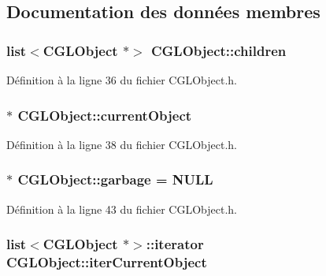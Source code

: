 \subsection{Documentation des données membres}
\hypertarget{class_c_g_l_object_ac7dc91801d4a50f24e1624283a7a3190}{
\subsubsection[{children}]{\setlength{\rightskip}{0pt plus 5cm}list$<${\bf C\-G\-L\-Object} $\ast$$>$ C\-G\-L\-Object\-::children\hspace{0.3cm}{\ttfamily [protected]}}}\label{class_c_g_l_object_ac7dc91801d4a50f24e1624283a7a3190}


Définition à la ligne 36 du fichier C\-G\-L\-Object.\-h.

\hypertarget{class_c_g_l_object_a3e0d024fd6deb36518196f57aab75d2b}{
\subsubsection[{current\-Object}]{$\ast$ C\-G\-L\-Object\-::current\-Object\hspace{0.3cm}{\ttfamily [protected]}}}\label{class_c_g_l_object_a3e0d024fd6deb36518196f57aab75d2b}


Définition à la ligne 38 du fichier C\-G\-L\-Object.\-h.

\hypertarget{class_c_g_l_object_aa042ffd6be6c676dd6fa779c2e23752d}{
\subsubsection[{garbage}]{ $\ast$ C\-G\-L\-Object\-::garbage = N\-U\-L\-L\hspace{0.3cm}{\ttfamily [static]}}}\label{class_c_g_l_object_aa042ffd6be6c676dd6fa779c2e23752d}


Définition à la ligne 43 du fichier C\-G\-L\-Object.\-h.

\hypertarget{class_c_g_l_object_a9e1debfc7948f902f40d07a7da209203}{
\subsubsection[{iter\-Current\-Object}]{\setlength{\rightskip}{0pt plus 5cm}list$<${\bf C\-G\-L\-Object} $\ast$$>$\-::iterator C\-G\-L\-Object\-::iter\-Current\-Object\hspace{0.3cm}{\ttfamily [protected]}}}\label{class_c_g_l_object_a9e1debfc7948f902f40d07a7da209203}


